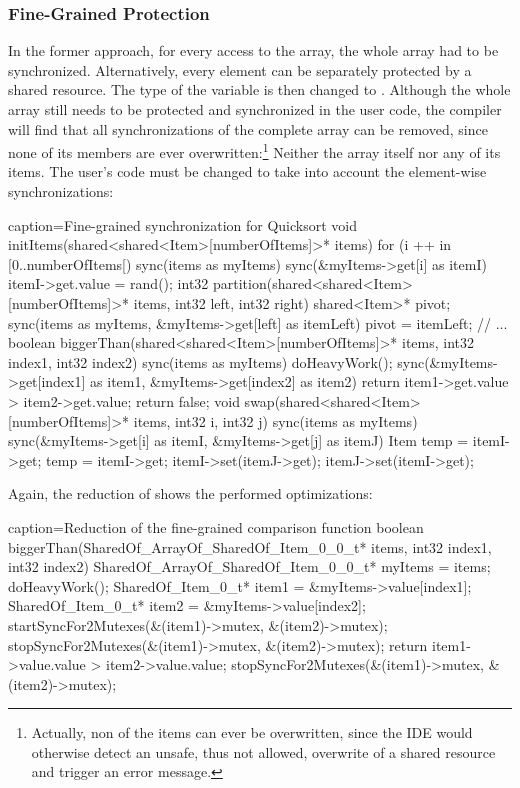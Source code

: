 \subsubsection{Fine-Grained Protection}
In the former approach, for every access to the array, the whole array had to be synchronized. Alternatively, every element can be separately protected by a shared resource. The type of the  variable is then changed to . Although the whole array still needs to be protected and synchronized in the user code, the compiler will find that all synchronizations of the complete array can be removed, since none of its members are ever overwritten:\footnote{Actually, non of the items can ever be overwritten, since the IDE would otherwise detect an unsafe, thus not allowed, overwrite of a shared resource and trigger an error message.} Neither the array itself nor any of its items. The user's code must be changed to take into account the element-wise synchronizations:
\begin{ccode}{caption=Fine-grained synchronization for Quicksort}
void initItems(shared<shared<Item>[numberOfItems]>* items) { 
  for (i ++ in [0..numberOfItems[) { 
    sync(items as myItems) { 
      sync(&myItems->get[i] as itemI) { itemI->get.value = rand(); } 
    } 
  }
}
int32 partition(shared<shared<Item>[numberOfItems]>* items, int32 left, int32 right) { 
  shared<Item>* pivot; 
  sync(items as myItems, &myItems->get[left] as itemLeft) { pivot = itemLeft; } 
  // ...
}
boolean biggerThan(shared<shared<Item>[numberOfItems]>* items, int32 index1, int32 index2) { 
  sync(items as myItems) {
    doHeavyWork();  
    sync(&myItems->get[index1] as item1, &myItems->get[index2] as item2) { 
      return item1->get.value > item2->get.value; 
    } 
  } 
  return false; 
}
void swap(shared<shared<Item>[numberOfItems]>* items, int32 i, int32 j) { 
  sync(items as myItems) { 
    sync(&myItems->get[i] as itemI, &myItems->get[j] as itemJ) { 
      Item temp = itemI->get; 
      temp = itemI->get; 
      itemI->set(itemJ->get); 
      itemJ->set(itemI->get); 
    } 
  } 
}
\end{ccode}
Again, the reduction of  shows the performed optimizations:
\begin{ccode}{caption=Reduction of the fine-grained comparison function}
boolean biggerThan(SharedOf_ArrayOf_SharedOf_Item_0_0_t* items, int32 index1, int32 index2) {
  { 
    SharedOf_ArrayOf_SharedOf_Item_0_0_t* myItems = items; 
    { 
      doHeavyWork(); 
      { 
        SharedOf_Item_0_t* item1 = &myItems->value[index1]; 
        SharedOf_Item_0_t* item2 = &myItems->value[index2]; 
        startSyncFor2Mutexes(&(item1)->mutex, &(item2)->mutex); 
        { 
          stopSyncFor2Mutexes(&(item1)->mutex, &(item2)->mutex);  
          return item1->value.value > item2->value.value; 
        } 
        stopSyncFor2Mutexes(&(item1)->mutex, &(item2)->mutex); 
      } 
    } 
  }
}
\end{ccode}
